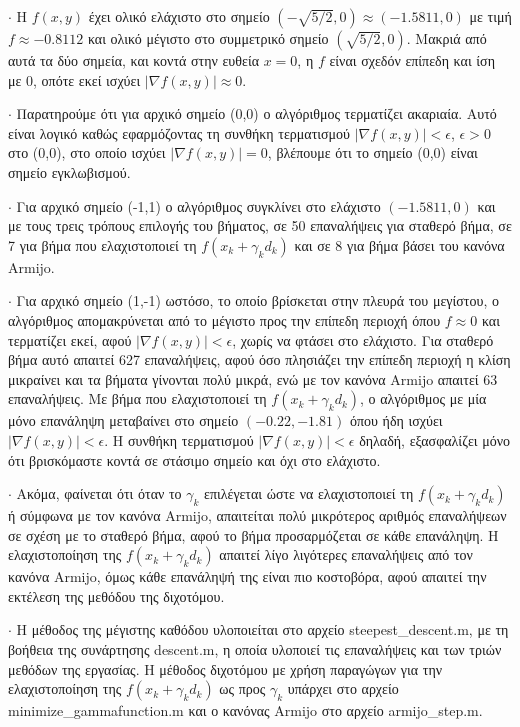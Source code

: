 \documentclass[11pt,a4paper,onecolumn,final]{article}
\begin{document}
{{\begin{flushleft}
\label{comm}

\(\cdot\) Η \(f(x,y)\) έχει ολικό ελάχιστο στο σημείο \((-\sqrt{5/2},0)\approx(-1.5811,0)\) με τιμή \(f\approx-0.8112\) και ολικό μέγιστο στο συμμετρικό σημείο \((\sqrt{5/2},0)\). Μακριά από αυτά τα δύο σημεία, και κοντά στην ευθεία \(x=0\), η \(f\) είναι σχεδόν επίπεδη και ίση με 0, οπότε εκεί ισχύει \(|\nabla f(x,y)|\approx 0\).

\(\cdot\) Παρατηρούμε ότι για αρχικό σημείο (0,0) ο αλγόριθμος τερματίζει ακαριαία. Αυτό είναι λογικό καθώς εφαρμόζοντας τη συνθήκη τερματισμού \(|\nabla f(x,y)|<\epsilon\), \(\epsilon>0\) στο (0,0), στο οποίο  ισχύει \(|\nabla f(x,y)|=0\), βλέπουμε ότι το σημείο (0,0) είναι σημείο εγκλωβισμού.

\(\cdot\) Για αρχικό σημείο (-1,1) ο αλγόριθμος συγκλίνει στο ελάχιστο \((-1.5811,0)\) και με τους τρεις τρόπους επιλογής του βήματος, σε 50 επαναλήψεις για σταθερό βήμα, σε 7 για βήμα που ελαχιστοποιεί τη \(f(x_{k}+\gamma_{k}d_{k})\) και σε 8 για βήμα βάσει του κανόνα Armijo.

\(\cdot\) Για αρχικό σημείο (1,-1) ωστόσο, το οποίο βρίσκεται στην πλευρά του μεγίστου, ο αλγόριθμος απομακρύνεται από το μέγιστο προς την επίπεδη περιοχή όπου \(f\approx 0\) και τερματίζει εκεί, αφού \(|\nabla f(x,y)|<\epsilon\), χωρίς να φτάσει στο ελάχιστο. Για σταθερό βήμα αυτό απαιτεί 627 επαναλήψεις, αφού όσο πλησιάζει την επίπεδη περιοχή η κλίση μικραίνει και τα βήματα γίνονται πολύ μικρά, ενώ με τον κανόνα Armijo απαιτεί 63 επαναλήψεις. Με βήμα που ελαχιστοποιεί τη \(f(x_{k}+\gamma_{k}d_{k})\), ο αλγόριθμος με μία μόνο επανάληψη μεταβαίνει στο σημείο \((-0.22,-1.81)\) όπου ήδη ισχύει \(|\nabla f(x,y)|<\epsilon\). Η συνθήκη τερματισμού \(|\nabla f(x,y)|<\epsilon\) δηλαδή, εξασφαλίζει μόνο ότι βρισκόμαστε κοντά σε στάσιμο σημείο και όχι στο ελάχιστο.

\(\cdot\) Ακόμα, φαίνεται ότι όταν το \(\gamma_{k}\) επιλέγεται ώστε να ελαχιστοποιεί τη \(f(x_{k}+\gamma_{k}d_{k})\) ή σύμφωνα με τον κανόνα Armijo, απαιτείται πολύ μικρότερος αριθμός επαναλήψεων σε σχέση με το σταθερό βήμα, αφού το βήμα προσαρμόζεται σε κάθε επανάληψη. Η ελαχιστοποίηση της \(f(x_{k}+\gamma_{k}d_{k})\) απαιτεί λίγο λιγότερες επαναλήψεις από τον κανόνα Armijo, όμως κάθε επανάληψή της είναι πιο κοστοβόρα, αφού απαιτεί την εκτέλεση της μεθόδου της διχοτόμου.

\(\cdot\) Η μέθοδος της μέγιστης καθόδου υλοποιείται στο αρχείο steepest\_descent.m, με τη βοήθεια της συνάρτησης descent.m, η οποία υλοποιεί τις επαναλήψεις και των τριών μεθόδων της εργασίας. Η μέθοδος διχοτόμου με χρήση παραγώγων για την ελαχιστοποίηση της \(f(x_{k}+\gamma_{k}d_{k})\) ως προς \(\gamma_{k}\) υπάρχει στο αρχείο minimize\_gammafunction.m και ο κανόνας Armijo στο αρχείο armijo\_step.m.


\end{flushleft}}}
\end{document}
